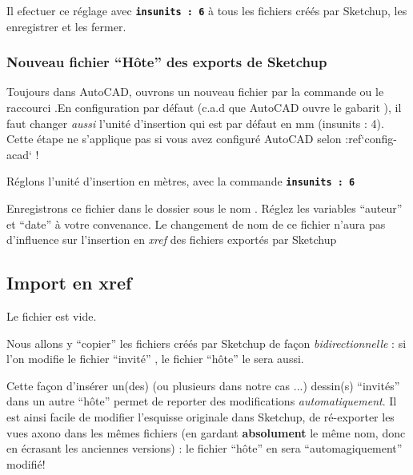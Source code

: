 \documentclass[a4paper,12pt,french]{sphinxmanual}
\begin{document}
Il efectuer ce réglage avec \textbf{\texttt{insunits : 6}} à tous les fichiers   créés par Sketchup, les enregistrer et les fermer.


\subsubsection{Nouveau fichier ``Hôte'' des exports de Sketchup}
\label{init_su+acad/004_acad1:nouveau-fichier-hote-des-exports-de-su}
Toujours dans AutoCAD, ouvrons un nouveau fichier par la commande  ou le raccourci .En configuration par défaut (c.a.d que AutoCAD ouvre le gabarit ), il faut changer \emph{aussi} l'unité d'insertion qui est par défaut en mm (insunits : 4). Cette étape ne s'applique pas si vous avez configuré AutoCAD selon :ref{}`config-acad{}` !

Réglons l'unité d'insertion en mètres, avec la commande \textbf{\texttt{insunits : 6}}

Enregistrons ce fichier dans le dossier  sous le nom . Réglez les variables ``auteur'' et ``date'' à votre convenance. Le changement de nom de ce fichier n'aura pas d'influence sur l'insertion en \emph{xref} des fichiers exportés par Sketchup


\subsection{Import en xref}
\label{init_su+acad/004_acad1:import-en-xref}
Le fichier   est vide.

Nous allons y ``copier'' les fichiers créés par Sketchup de façon \emph{bidirectionnelle} : si l'on modifie le fichier ``invité'' , le fichier ``hôte'' le sera aussi.

Cette façon d'insérer un(des) (ou plusieurs dans notre cas ...) dessin(s) ``invités'' dans un autre ``hôte'' permet de reporter des modifications \emph{automatiquement}. Il est ainsi facile de modifier l'esquisse originale dans Sketchup, de ré-exporter les vues axono dans les mêmes fichiers  (en gardant \textbf{absolument} le même nom, donc en écrasant les anciennes versions) : le fichier ``hôte'' en sera ``automagiquement'' modifié!
\end{document}
